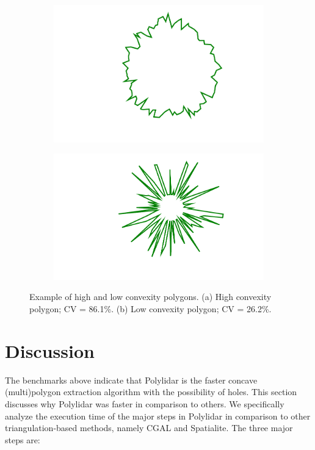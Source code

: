 \begin{figure}[ht]
    \centering
  \begin{subfigure}[t]{.25\linewidth}
    \centering
    \includegraphics[width=0.99\linewidth]{chapter_2_polylidar/imgs/hi_convexity.pdf}
    \caption{}
    \label{fig:ch2_hi_convexity}
  \end{subfigure}
  \begin{subfigure}[t]{.26\linewidth}
    \centering
     \includegraphics[width=.99\linewidth]{chapter_2_polylidar/imgs/low_convexity.pdf}
    \caption{}
    \label{fig:ch2_low_convexity}
  \end{subfigure}
  \caption[Example of high and low convexity polygons]{Example of high and low convexity polygons. (a) High convexity polygon; CV = 86.1\%. (b) Low convexity polygon; CV = 26.2\%.}
  \label{fig:ch2_convexity} 
\end{figure}


\section{Discussion}\label{sec:ch2_discussion}
The benchmarks above indicate that Polylidar is the faster concave (multi)polygon extraction algorithm with the possibility of holes. This section discusses why Polylidar was faster in comparison to others. We specifically analyze the execution time of the major steps in Polylidar in comparison to other triangulation-based methods, namely CGAL and Spatialite. The three major steps are:


